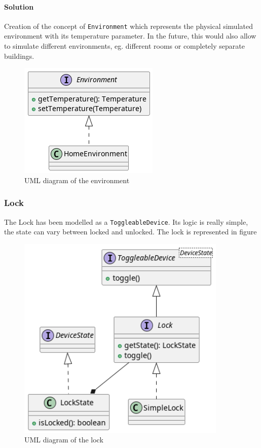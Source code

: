 \paragraph{Solution} Creation of the concept of \texttt{Environment} which represents the
physical simulated environment with its temperature parameter.
In the future, this would also allow to simulate different environments, eg. different rooms or completely
separate buildings.

\begin{figure}[H]
\centering{}
\includegraphics[keepaspectratio]{magnani/uml/environment.png}
\caption{UML diagram of the environment}
\label{magnani:uml:environment}
\end{figure}

\subsubsection{Lock}

The Lock has been modelled as a \texttt{ToggleableDevice}.
Its logic is really simple, the state can vary between locked and unlocked.
The lock is represented in figure 

\begin{figure}[H]
\centering{}
\includegraphics[width=10cm,height=\textheight,keepaspectratio]{magnani/uml/lock.png}
\caption{UML diagram of the lock}
\label{magnani:uml:lock}
\end{figure}

